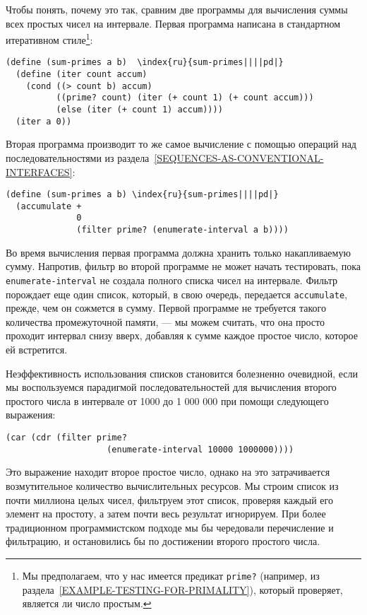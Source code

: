 Чтобы понять, почему это так, сравним две программы для
вычисления суммы всех простых чисел на интервале.  Первая программа
написана в стандартном итеративном стиле\footnote{Мы предполагаем, что у нас имеется предикат
{\tt prime?} (например, из
раздела~\ref{EXAMPLE-TESTING-FOR-PRIMALITY}), который проверяет,
является ли число простым.}:

\begin{Verbatim}[fontsize=\small]
(define (sum-primes a b)  \index{ru}{sum-primes||||pd|}
  (define (iter count accum)
    (cond ((> count b) accum)
          ((prime? count) (iter (+ count 1) (+ count accum)))
          (else (iter (+ count 1) accum))))
  (iter a 0))
\end{Verbatim}

Вторая программа производит то же самое вычисление с помощью операций
над последовательностями из
раздела~\ref{SEQUENCES-AS-CONVENTIONAL-INTERFACES}:

\begin{Verbatim}[fontsize=\small]
(define (sum-primes a b) \index{ru}{sum-primes||||pd|}
  (accumulate +
              0
              (filter prime? (enumerate-interval a b))))
\end{Verbatim}

Во время вычисления первая программа должна хранить только
накапливаемую сумму.  Напротив, фильтр во второй программе не может
начать тестировать, пока {\tt enumerate-interval} не создала
полного списка чисел на интервале.  Фильтр порождает еще один список,
который, в свою очередь, передается {\tt accumulate}, прежде,
чем он сожмется в сумму.  Первой программе не требуется такого
количества промежуточной памяти, ---  мы можем считать, что она
просто проходит интервал снизу вверх, добавляя к сумме каждое
простое число, которое ей встретится.

Неэффективность использования списков становится болезненно
очевидной, если мы воспользуемся парадигмой последовательностей для
вычисления второго простого числа в интервале от 1000 до 1 000 000 при
помощи следующего выражения:

\begin{Verbatim}[fontsize=\small]
(car (cdr (filter prime?
                    (enumerate-interval 10000 1000000))))
\end{Verbatim}

Это выражение находит второе простое число, однако на это затрачивается
возмутительное количество вычислительных ресурсов.  Мы строим список из
почти миллиона целых чисел, фильтруем этот список, проверяя каждый
его элемент на простоту, а затем почти весь результат игнорируем.  При
более традиционном программистском подходе мы бы чередовали
перечисление и фильтрацию, и остановились бы по достижении второго
простого числа.

